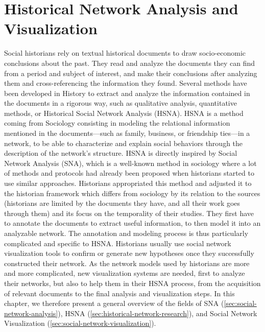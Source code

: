
\chapter{Historical Network Analysis and Visualization}\label{ch:related-work}

Social historians rely on textual historical documents to draw socio-economic conclusions about the past.
They read and analyze the documents they can find from a period and subject of interest, and make their conclusions after analyzing them and cross-referencing the information they found.
Several methods have been developed in History to extract and analyze the information contained in the documents in a rigorous way, such as qualitative analysis, quantitative methods, or Historical Social Network Analysis (HSNA).
HSNA is a method coming from Sociology consisting in modeling the relational information mentioned in the documents---such as family, business, or friendship ties---in a network, to be able to characterize and explain social behaviors through the description of the network's structure.
HSNA is directly inspired by Social Network Analysis (SNA), which is a well-known method in sociology where a lot of methods and protocols had already been proposed when historians started to use similar approaches.
Historians appropriated this method and adjusted it to the historian framework which differs from sociology by its relation to the sources (historians are limited by the documents they have, and all their work goes through them) and its focus on the temporality of their studies.
They first have to annotate the documents to extract useful information, to then model it into an analyzable network.
The annotation and modeling process is thus particularly complicated and specific to HSNA.
Historians usually use social network visualization tools to confirm or generate new hypotheses once they successfully constructed their network.
As the network models used by historians are more and more complicated, new visualization systems are needed, first to analyze their networks, but also to help them in their HSNA process, from the acquisition of relevant documents to the final analysis and visualization steps.
In this chapter, we therefore present a general overview of the fields of SNA (\autoref{sec:social-network-analysis}), HSNA (\autoref{sec:historical-network-research}), and Social Network Visualization (\autoref{sec:social-network-visualization}).



